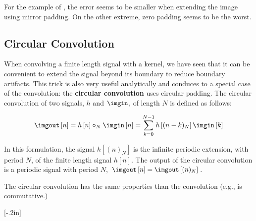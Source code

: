 For the example of \fig{\ref{fig:boundaries}}, the error seems to be smaller when extending the image using mirror padding. On the other extreme, zero padding seems to be the worst.
%






\subsection{Circular Convolution}

When convolving a finite length signal with a kernel, we have seen that it can be convenient to extend the signal beyond its boundary to reduce boundary artifacts. This trick is also very useful analytically and conduces to a special case of the convolution: the {\bf circular convolution} uses circular padding. The circular convolution of two signals, $h$ and $\imgin$, of length $N$ is defined as follows:

\begin{equation}
	\imgout \left[n\right] = h \left[n\right] \circ_N \imgin \left[n\right] =  \sum_{k=0}^{N-1} h \left[(n-k)_N \right] \imgin \left[k \right]
\end{equation}



In this formulation, the signal $h \left[ (n)_N \right]$ is the infinite periodic extension, with period $N$, of the finite length signal $h \left[n \right]$. The output of the circular convolution is a periodic signal with period $N$, $\imgout \left[n \right] = \imgout \left[(n)_N \right]$.


The circular convolution has the same properties than the convolution (e.g., is commutative.)

[-.2in]

